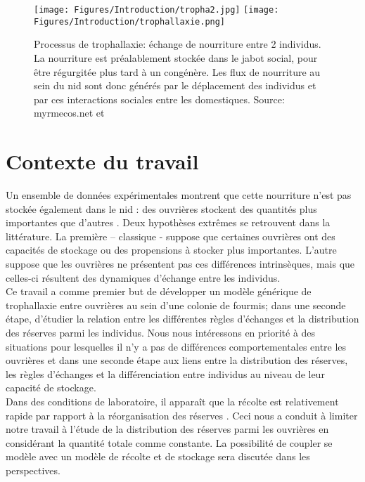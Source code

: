 \begin{figure}[h]
\centering
\texttt{[image: Figures/Introduction/tropha2.jpg]}
\texttt{[image: Figures/Introduction/trophallaxie.png]}
\caption{Processus de trophallaxie: échange de nourriture entre 2 individus. La nourriture est préalablement stockée dans le jabot social, pour être régurgitée plus tard à un congénère. Les flux de nourriture au sein du nid sont donc générés par le déplacement des individus et par ces interactions sociales entre les domestiques.  Source: myrmecos.net et \citep{holldobler_ants_1990}}
\label{trophallaxie}
\end{figure}


\section{Contexte du travail}

Un ensemble de données expérimentales montrent que cette nourriture n'est pas stockée également dans le nid : des ouvrières stockent des quantités plus importantes que d'autres \citep{buffin_feeding_2009,buffin_collective_2012}. Deux hypothèses extrêmes se retrouvent dans la littérature. La première – classique - suppose que certaines ouvrières ont des capacités de stockage ou des propensions à stocker plus importantes. L'autre suppose que les ouvrières ne présentent pas ces différences intrinsèques, mais que celles-ci résultent des dynamiques d'échange entre les individus.\\

Ce travail a comme premier but de développer un modèle générique de trophallaxie entre ouvrières au sein d'une colonie de fourmis; dans une seconde étape, d'étudier la relation entre les différentes règles d'échanges et la distribution des réserves parmi les individus. Nous nous intéressons en priorité à des situations pour lesquelles il n'y a pas de différences comportementales entre les ouvrières et dans une seconde étape aux liens entre la distribution des réserves, les règles d'échanges et la différenciation entre individus au niveau de leur capacité de stockage.\\

Dans des conditions de laboratoire, il apparaît que la récolte est relativement rapide par rapport à la réorganisation des réserves  \citep{buffin_feeding_2009,buffin_collective_2012}. Ceci nous a conduit à limiter notre travail à l'étude de la distribution des réserves parmi les ouvrières en considérant la quantité totale comme constante. La possibilité de coupler se modèle avec un modèle de récolte et de stockage sera discutée dans les perspectives.\\

